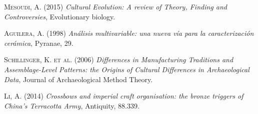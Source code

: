 \documentclass[a4paper]{article}
\begin{document}
\begin{thebibliography}{50}
	\textsc{Mesoudi, A. (2015)}
	\textit{Cultural Evolution: A review of Theory, Finding and Controversies}, Evolutionary biology.

	\textsc{Aguilera, A. (1998)}
	\textit{An\'alisis multivariable: una nueva v\'ia para la caracterizaci\'on cer\'amica}, Pyranae, 29.

	\textsc{Schillinger, K. et al. (2006)}
	\textit{Differences in Manufacturing Traditions and Assemblage-Level Patterns: the Origins of Cultural Differences in Archaeological Data}, Journal of Archaeological Method Theory.

	\textsc{Li, A. (2014)}
	\textit{Crossbows and imperial craft organisation: the bronze triggers of China's Terracotta Army}, Antiquity, 88.339.

\end{thebibliography}
\end{document}
